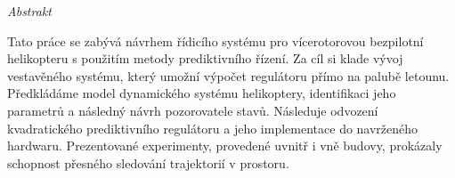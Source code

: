 \vfill
\begin{center}
{\it \large Abstrakt}
\vspace{0.2cm}

\begin{minipage}{0.8\textwidth}{
Tato práce se zabývá návrhem řídicího systému pro vícerotorovou bezpilotní helikopteru s použitím metody prediktivního řízení. Za cíl si klade vývoj vestavěného systému, který umožní výpočet regulátoru přímo na palubě letounu. Předkládáme model dynamického systému helikoptery, identifikaci jeho parametrů a následný návrh pozorovatele stavů. Následuje odvození kvadratického prediktivního regulátoru a jeho implementace do navrženého hardwaru. Prezentované experimenty, provedené uvnitř i vně budovy, prokázaly schopnost přesného sledování trajektorií v prostoru.
}
\end{minipage}
\end{center}
\vfill
\vspace{1cm}
\newpage{}